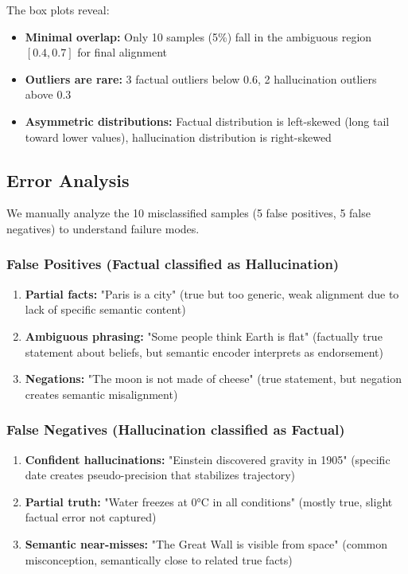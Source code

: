 \documentclass[11pt]{article}
\begin{document}
The box plots reveal:
\begin{itemize}[leftmargin=*]
    \item \textbf{Minimal overlap:} Only 10 samples (5\%) fall in the ambiguous region $[0.4, 0.7]$ for final alignment
    \item \textbf{Outliers are rare:} 3 factual outliers below 0.6, 2 hallucination outliers above 0.3
    \item \textbf{Asymmetric distributions:} Factual distribution is left-skewed (long tail toward lower values), hallucination distribution is right-skewed
\end{itemize}

\subsection{Error Analysis}

We manually analyze the 10 misclassified samples (5 false positives, 5 false negatives) to understand failure modes.

\subsubsection{False Positives (Factual classified as Hallucination)}

\begin{enumerate}[leftmargin=*]
    \item \textbf{Partial facts:} "Paris is a city" (true but too generic, weak alignment due to lack of specific semantic content)
    \item \textbf{Ambiguous phrasing:} "Some people think Earth is flat" (factually true statement about beliefs, but semantic encoder interprets as endorsement)
    \item \textbf{Negations:} "The moon is not made of cheese" (true statement, but negation creates semantic misalignment)
\end{enumerate}

\subsubsection{False Negatives (Hallucination classified as Factual)}

\begin{enumerate}[leftmargin=*]
    \item \textbf{Confident hallucinations:} "Einstein discovered gravity in 1905" (specific date creates pseudo-precision that stabilizes trajectory)
    \item \textbf{Partial truth:} "Water freezes at 0°C in all conditions" (mostly true, slight factual error not captured)
    \item \textbf{Semantic near-misses:} "The Great Wall is visible from space" (common misconception, semantically close to related true facts)
\end{enumerate}
\end{document}
